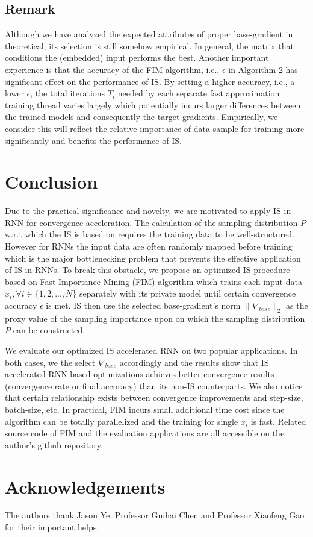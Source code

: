 \documentclass[twoside,leqno,twocolumn]{article}
\begin{document}
\subsection{Remark}
Although we have analyzed the expected attributes of proper base-gradient in theoretical, its selection is still somehow empirical. In general, the matrix that conditions the (embedded) input performs the best. Another important experience is that the accuracy of the FIM algorithm, i.e., $\epsilon$ in Algorithm 2 has significant effect on the performance of IS. By setting a higher accuracy, i.e., a lower $\epsilon$, the total iterations $T_i$ needed by each separate fast approximation training thread varies largely which potentially incurs larger differences between the trained models and consequently the target gradients. Empirically, we consider this will reflect the relative importance of data sample for training more significantly and benefits the performance of IS.
\section{Conclusion}
Due to the practical significance and novelty, we are motivated to apply IS in RNN for convergence acceleration. The calculation of the sampling distribution $P$ w.r.t which the IS is based on requires the training data to be well-structured. However for RNNs the input data are often randomly mapped before training which is the major bottlenecking problem that prevents the effective application of IS in RNNs. To break this obstacle, we propose an optimized IS procedure based on Fast-Importance-Mining (FIM) algorithm which trains each input data $x_i, \forall i\in\{1,2,...,N\}$ separately with its private model until certain convergence accuracy $\epsilon$ is met. IS then use the selected base-gradient's norm $\|\nabla_{base}\|_2$ as the proxy value of the sampling importance upon on which the sampling distribution $P$ can be constructed.

We evaluate our optimized IS accelerated RNN on two popular applications. In both cases, we the select $\nabla_{base}$ accordingly and the results show that IS accelerated RNN-based optimizations achieves better convergence results (convergence rate or final accuracy) than its non-IS counterparts. We also notice that certain relationship exists between convergence improvements and step-size, batch-size, etc. In practical, FIM incurs small additional time cost since the algorithm can be totally parallelized and the training for single $x_i$ is fast. Related source code of FIM and the evaluation applications are all accessible on the author's github repository.
\section*{Acknowledgements}
The authors thank Jason Ye, Professor Guihai Chen and Professor Xiaofeng Gao for their important helps.


\end{document}
